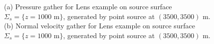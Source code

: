 \documentclass[12pt]{geophysics}
\begin{document}
\begin{figure}
  \centering
  \caption{(a) Pressure gather for Lens example on source surface
    $\Sigma_s=\{z=1000\mbox{ m}\}$, generated by point source at
    $(3500,3500)$ m. (b) Normal velocity gather for Lens example on source surface
    $\Sigma_s=\{z=1000\mbox{ m}\}$, generated by point source at
    $(3500,3500)$ m.}
\end{figure}
\end{document}
